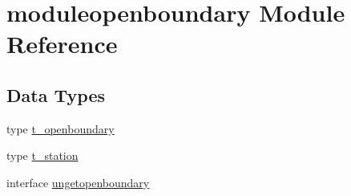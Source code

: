 \hypertarget{namespacemoduleopenboundary}{}\section{moduleopenboundary Module Reference}
\label{namespacemoduleopenboundary}
\subsection*{Data Types}
\begin{DoxyCompactItemize}
\item 
type \mbox{\hyperlink{structmoduleopenboundary_1_1t__openboundary}{t\+\_\+openboundary}}
\item 
type \mbox{\hyperlink{structmoduleopenboundary_1_1t__station}{t\+\_\+station}}
\item 
interface \mbox{\hyperlink{interfacemoduleopenboundary_1_1ungetopenboundary}{ungetopenboundary}}
\end{DoxyCompactItemize}
